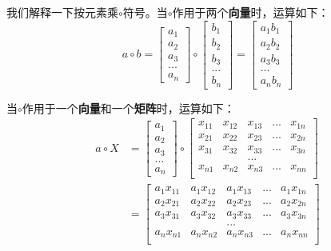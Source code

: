 我们解释一下按元素乘\(\circ\)符号。当\(\circ\)作用于两个\textbf{向量}时，运算如下：
\[
	{a}\circ{b}=\begin{bmatrix}
		a_1 \\a_2\\a_3\\...\\a_n
	\end{bmatrix}\circ\begin{bmatrix}
		b_1 \\b_2\\b_3\\...\\b_n
	\end{bmatrix}=\begin{bmatrix}
		a_1b_1 \\a_2b_2\\a_3b_3\\...\\a_nb_n
	\end{bmatrix}
\]

当\(\circ\)作用于一个\textbf{向量}和一个\textbf{矩阵}时，运算如下：
\begin{align*}
	{a}\circ X & =\begin{bmatrix}
		a_1 \\a_2\\a_3\\...\\a_n
	\end{bmatrix}\circ\begin{bmatrix}
		x_{11} & x_{12} & x_{13} & ... & x_{1n} \\
		x_{21} & x_{22} & x_{23} & ... & x_{2n} \\
		x_{31} & x_{32} & x_{33} & ... & x_{3n} \\
		       &        & ...                   \\
		x_{n1} & x_{n2} & x_{n3} & ... & x_{nn} \\
	\end{bmatrix} \\
	           & =\begin{bmatrix}
		a_1x_{11} & a_1x_{12} & a_1x_{13} & ... & a_1x_{1n} \\
		a_2x_{21} & a_2x_{22} & a_2x_{23} & ... & a_2x_{2n} \\
		a_3x_{31} & a_3x_{32} & a_3x_{33} & ... & a_3x_{3n} \\
		          &           & ...                         \\
		a_nx_{n1} & a_nx_{n2} & a_nx_{n3} & ... & a_nx_{nn} \\
	\end{bmatrix}
\end{align*}

